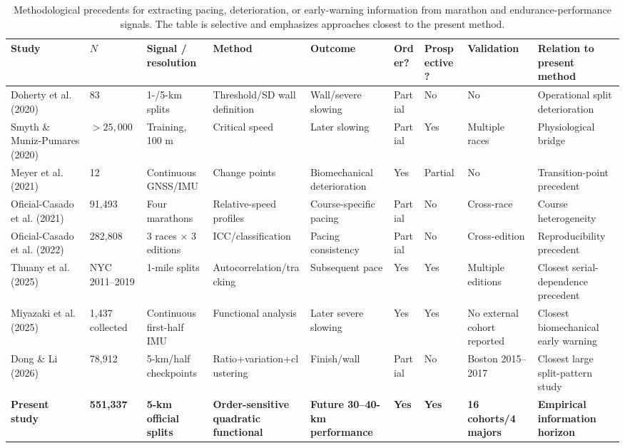 \begin{table}[ht]
\centering
\caption{Methodological precedents for extracting pacing, deterioration, or early-warning information from marathon and endurance-performance signals. The table is selective and emphasizes approaches closest to the present method.}
\label{tab:evidence_map}\scriptsize
\begin{tabular}{p{2.2cm}p{1.1cm}p{2.1cm}p{2.3cm}p{2.2cm}p{1cm}p{1.2cm}p{1.7cm}p{2.7cm}}\toprule
Study & $N$ & Signal / resolution & Method & Outcome & Order? & Prospective? & Validation & Relation to present method\\\midrule
Doherty et al. (2020) & 83 & 1-/5-km splits & Threshold/SD wall definition & Wall/severe slowing & Partial & No & No & Operational split deterioration\\
Smyth \& Muniz-Pumares (2020) & $>25{,}000$ & Training, 100 m & Critical speed & Later slowing & Partial & Yes & Multiple races & Physiological bridge\\
Meyer et al. (2021) & 12 & Continuous GNSS/IMU & Change points & Biomechanical deterioration & Yes & Partial & No & Transition-point precedent\\
Oficial-Casado et al. (2021) & 91,493 & Four marathons & Relative-speed profiles & Course-specific pacing & Partial & No & Cross-race & Course heterogeneity\\
Oficial-Casado et al. (2022) & 282,808 & 3 races $\times$ 3 editions & ICC/classification & Pacing consistency & Partial & No & Cross-edition & Reproducibility precedent\\
Thuany et al. (2025) & NYC 2011--2019 & 1-mile splits & Autocorrelation/tracking & Subsequent pace & Yes & Yes & Multiple editions & Closest serial-dependence precedent\\
Miyazaki et al. (2025) & 1,437 collected & Continuous first-half IMU & Functional analysis & Later severe slowing & Yes & Yes & No external cohort reported & Closest biomechanical early warning\\
Dong \& Li (2026) & 78,912 & 5-km/half checkpoints & Ratio+variation+clustering & Finish/wall & Partial & No & Boston 2015--2017 & Closest large split-pattern study\\
\textbf{Present study} & \textbf{551,337} & \textbf{5-km official splits} & \textbf{Order-sensitive quadratic functional} & \textbf{Future 30--40-km performance} & \textbf{Yes} & \textbf{Yes} & \textbf{16 cohorts/4 majors} & \textbf{Empirical information horizon}\\\bottomrule
\end{tabular}\end{table}
